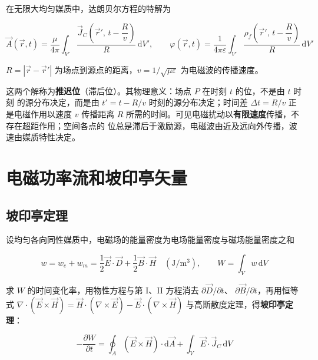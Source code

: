 在无限大均匀媒质中，达朗贝尔方程的特解为

\begin{formulaBox}
\[
\vec{A}(\vec{r},t)=\frac{\mu}{4\pi}\int_{V'}
\frac{\vec{J}_C\left(\vec{r}',\,t-\dfrac{R}{v}\right)}{R}\,\mathrm{d}V',
\qquad
\varphi(\vec{r},t)=\frac{1}{4\pi\varepsilon}\int_{V'}
\frac{\rho_f\left(\vec{r}',\,t-\dfrac{R}{v}\right)}{R}\,\mathrm{d}V'
\]
\end{formulaBox}
$R=|\vec{r}-\vec{r}'|$ 为场点到源点的距离，$v=1/\sqrt{\mu\varepsilon}$ 为电磁波的传播速度。

这两个解称为\textbf{推迟位}（滞后位）。其物理意义：场点 $P$ 在时刻 $t$ 的位，不是由 $t$ 时刻
的源分布决定，而是由 $t'=t-R/v$ 时刻的源分布决定；时间差 $\Delta t=R/v$ 正是电磁作用以速度
$v$ 传播距离 $R$ 所需的时间。可见电磁扰动以\textbf{有限速度}传播，不存在超距作用；空间各点的
位总是滞后于激励源，电磁波由近及远向外传播，波速由媒质特性决定。


\section{电磁功率流和坡印亭矢量}

\subsection{坡印亭定理}

设均匀各向同性媒质中，电磁场的能量密度为电场能量密度与磁场能量密度之和
\begin{formulaBox}
\[
w=w_e+w_m=\frac{1}{2}\vec{E}\cdot\vec{D}+\frac{1}{2}\vec{B}\cdot\vec{H}
\quad(\mathrm{J/m^3}),
\qquad
W=\int_{V}w\,\mathrm{d}V
\]
\end{formulaBox}

求 $W$ 的时间变化率，用物性方程与第 I、II 方程消去 $\partial\vec{D}/\partial t$、
$\partial\vec{B}/\partial t$，再用恒等式
$\nabla\cdot(\vec{E}\times\vec{H})=\vec{H}\cdot(\nabla\times\vec{E})
-\vec{E}\cdot(\nabla\times\vec{H})$ 与高斯散度定理，得\textbf{坡印亭定理}：

\begin{formulaBox}
\[
-\frac{\partial W}{\partial t}
=\oint_{A}(\vec{E}\times\vec{H})\cdot \mathrm{d}\vec{A}
+\int_{V}\vec{E}\cdot\vec{J}_C\,\mathrm{d}V
\]
\end{formulaBox}

